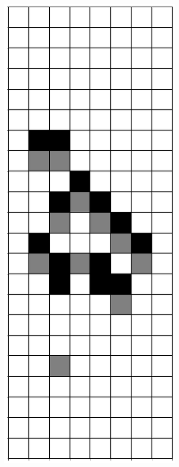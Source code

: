 \documentclass[12pt]{article}
\numberwithin{figure}{section} %
\begin{document}
\begin{figure}[H]
\begin{subfigure}{0.19\textwidth}
     \subcaption{}
   \end{subfigure}
           \begin{subfigure}{0.19\textwidth}
     \centering
     \includegraphics[width=\linewidth]{Section4/28.3}

\end{subfigure}
\end{figure}
\end{document}
